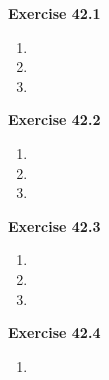 




\textbf{Exercise 42.1}
\begin{enumerate}
    \item 
    \item 
    \item 
\end{enumerate}

\textbf{Exercise 42.2}
\begin{enumerate}
    \item 
    \item 
    \item 
\end{enumerate}

\textbf{Exercise 42.3}
\begin{enumerate}
    \item 
    \item 
    \item 
\end{enumerate}

\textbf{Exercise 42.4}
\begin{enumerate}
    \item 
\end{enumerate}

